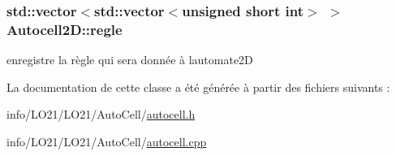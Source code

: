 \subsubsection[{\texorpdfstring{regle}{regle}}]{\setlength{\rightskip}{0pt plus 5cm}std\+::vector$<$std\+::vector$<$unsigned short int$>$ $>$ Autocell2\+D\+::regle\hspace{0.3cm}{\ttfamily [protected]}}\hypertarget{class_autocell2_d_a238eef6674e510f6ce39d93427c6cad5}{}\label{class_autocell2_d_a238eef6674e510f6ce39d93427c6cad5}
enregistre la règle qui sera donnée à l\textquotesingle{}automate2D 

La documentation de cette classe a été générée à partir des fichiers suivants \+:\begin{DoxyCompactItemize}
\item 
info/\+L\+O21/\+L\+O21/\+Auto\+Cell/\hyperlink{autocell_8h}{autocell.\+h}\item 
info/\+L\+O21/\+L\+O21/\+Auto\+Cell/\hyperlink{autocell_8cpp}{autocell.\+cpp}\end{DoxyCompactItemize}
